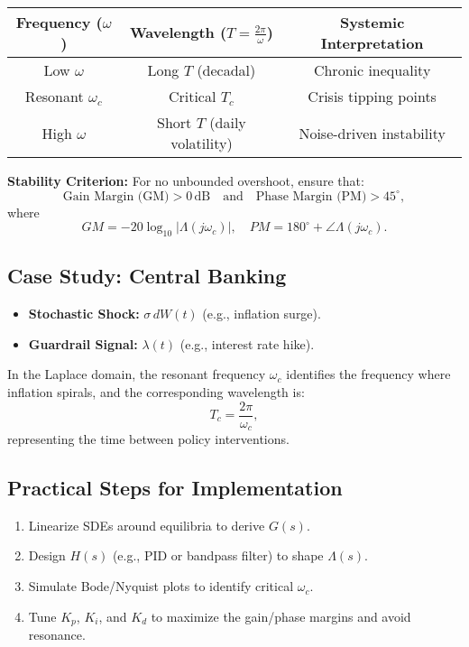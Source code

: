 \documentclass{article}
\theoremstyle{definition}
\begin{document}
\begin{center}
\begin{tabular}{@{}ccc@{}}
\toprule
Frequency ($\omega$) & Wavelength ($T = \frac{2\pi}{\omega}$) & Systemic Interpretation \\ \midrule
Low $\omega$       & Long $T$ (decadal)           & Chronic inequality     \\
Resonant $\omega_c$ & Critical $T_c$               & Crisis tipping points  \\
High $\omega$      & Short $T$ (daily volatility) & Noise-driven instability \\ \bottomrule
\end{tabular}
\end{center}

\textbf{Stability Criterion:} For no unbounded overshoot, ensure that:
\[
\text{Gain Margin (GM)} > 0\, \text{dB} \quad \text{and} \quad \text{Phase Margin (PM)} > 45^\circ,
\]
where
\[
GM = -20 \log_{10}\left|\Lambda(j\omega_c)\right|, \quad PM = 180^\circ + \angle\Lambda(j\omega_c).
\]

\subsection{Case Study: Central Banking}
\begin{itemize}
    \item \textbf{Stochastic Shock:} $\sigma\, dW(t)$ (e.g., inflation surge).
    \item \textbf{Guardrail Signal:} $\lambda(t)$ (e.g., interest rate hike).
\end{itemize}
In the Laplace domain, the resonant frequency $\omega_c$ identifies the frequency where inflation spirals, and the corresponding wavelength is:
\[
T_c = \frac{2\pi}{\omega_c},
\]
representing the time between policy interventions.

\subsection{Practical Steps for Implementation}
\begin{enumerate}
    \item Linearize SDEs around equilibria to derive $G(s)$.
    \item Design $H(s)$ (e.g., PID or bandpass filter) to shape $\Lambda(s)$.
    \item Simulate Bode/Nyquist plots to identify critical $\omega_c$.
    \item Tune $K_p$, $K_i$, and $K_d$ to maximize the gain/phase margins and avoid resonance.
\end{enumerate}
\end{document}
